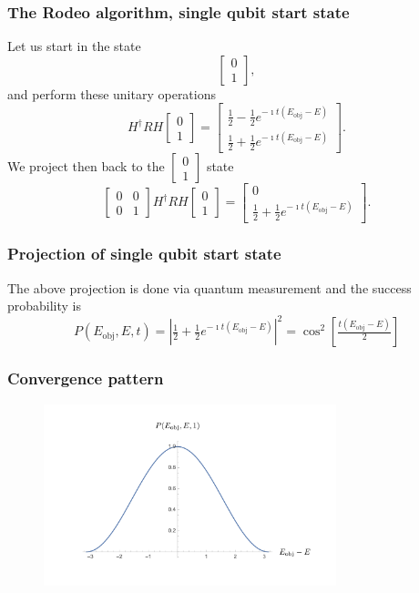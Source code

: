 \documentclass{beamer}
\begin{document}
\begin{frame}
\frametitle{The Rodeo algorithm, single qubit start state}
Let us start in the state
\[
\begin{bmatrix} 0 \\ 1\end{bmatrix},
\]
and perform these unitary operations 
\[
H^{\dagger}RH\begin{bmatrix} 0 \\ 1\end{bmatrix} =\begin{bmatrix} \tfrac{1}{2}-\tfrac{1}{2}e^{-\imath t(E_{\mathrm{obj}}-E)} \\ \tfrac{1}{2}+\tfrac{1}{2}e^{-\imath t(E_{\mathrm{obj}}-E)}\end{bmatrix}.
\]
We project then back to the $\begin{bmatrix} 0 \\ 1\end{bmatrix}$ state 
\[
\begin{bmatrix} 0 & 0 \\ 0 & 1\end{bmatrix}H^{\dagger}RH\begin{bmatrix} 0 \\ 1\end{bmatrix} =\begin{bmatrix} 0\\ \tfrac{1}{2}+\tfrac{1}{2}e^{-\imath t(E_{\mathrm{obj}}-E)}\end{bmatrix}.
\]

\end{frame}

\begin{frame}
\frametitle{Projection of single qubit start state}

The above  projection is done via quantum measurement and the success
probability is
\[
P(E_{\mathrm{obj}},E,t)= \left\vert\tfrac{1}{2}+\tfrac{1}{2}e^{-\imath t(E_{\mathrm{obj}}-E)}\right\vert^2=\cos^2{\left[\tfrac{t(E_{\mathrm{obj}}-E)}{2}\right]}
\]


\end{frame}


\begin{frame}
\frametitle{Convergence pattern}

\begin{figure}
\centering
\includegraphics[width=8.5cm]{rodeofigs/rodeo2.png}
\end{figure} 

\end{frame}
\end{document}
